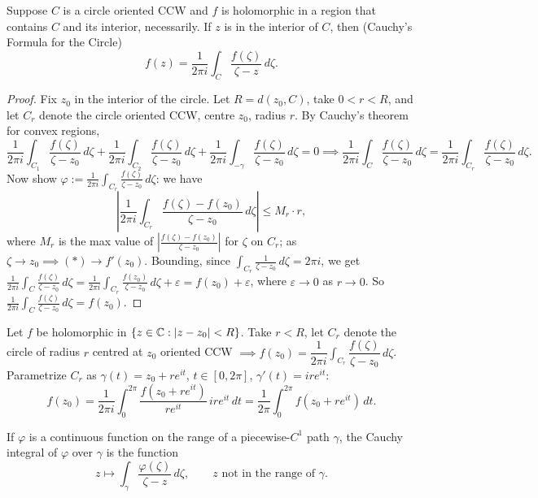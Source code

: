\documentclass[11pt]{article}
\begin{document}
\begin{theorem}
Suppose $C$ is a circle oriented CCW and $f$ is holomorphic in a region that contains $C$ and its interior, necessarily. If $z$ is in the interior of $C$, then \textup{(Cauchy's Formula for the Circle)}
\[
f(z) = \frac{1}{2\pi i} \int_C \frac{f(\zeta)}{\zeta - z} \, d\zeta.
\]
\end{theorem}

\begin{proof}
Fix $z_0$ in the interior of the circle. Let $R = d(z_0,C)$, take $0<r<R$, and let $C_r$ denote the circle oriented CCW, centre $z_0$, radius $r$. By Cauchy's theorem for convex regions,
\[
\frac{1}{2\pi i}\int_{C_1} \frac{f(\zeta)}{\zeta-z_0}\,d\zeta + \frac{1}{2\pi i}\int_{C_2} \frac{f(\zeta)}{\zeta-z_0}\,d\zeta + \frac{1}{2\pi i}\int_{-\gamma} \frac{f(\zeta)}{\zeta-z_0}\,d\zeta = 0 \implies \frac{1}{2\pi i}\int_C\frac{f(\zeta)}{\zeta-z_0}\,d\zeta = \frac{1}{2\pi i}\int_{C_r}\frac{f(\zeta)}{\zeta-z_0}\,d\zeta.
\]
Now show $\varphi := \frac{1}{2\pi i}\int_{C_r}\frac{f(\zeta)}{\zeta-z_0}\,d\zeta$: we have
\[
\left|\frac{1}{2\pi i}\int_{C_r}\frac{f(\zeta)-f(z_0)}{\zeta-z_0}\,d\zeta\right| \le M_r\cdot r,
\]
where $M_r$ is the max value of $\left|\frac{f(\zeta)-f(z_0)}{\zeta-z_0}\right|$ for $\zeta$ on $C_r$; as $\zeta \to z_0 \implies (*) \to f'(z_0)$. Bounding, since $\int_{C_r}\frac{1}{\zeta-z_0}\,d\zeta = 2\pi i$, we get $\frac{1}{2\pi i}\int_C\frac{f(\zeta)}{\zeta-z_0}\,d\zeta = \frac{1}{2\pi i}\int_{C_r}\frac{f(z_0)}{\zeta-z_0}\,d\zeta + \varepsilon = f(z_0) + \varepsilon$, where $\varepsilon \to 0$ as $r \to 0$. So $\frac{1}{2\pi i}\int_C\frac{f(\zeta)}{\zeta-z_0}\,d\zeta = f(z_0)$.
\end{proof}

\begin{corollary}
Let $f$ be holomorphic in $\{z\in{\mathbb{C}} : |z-z_0|<R\}$. Take $r<R$, let $C_r$ denote the circle of radius $r$ centred at $z_0$ oriented CCW $\implies f(z_0) = \dfrac{1}{2\pi i}\int_{C_r} \dfrac{f(\zeta)}{\zeta-z_0}\,d\zeta$.
Parametrize $C_r$ as $\gamma(t) = z_0+re^{it}$, $t\in[0,2\pi]$, $\gamma'(t)=ire^{it}$:
\[
f(z_0) = \frac{1}{2\pi i}\int_0^{2\pi} \frac{f(z_0+re^{it})}{re^{it}}\,ire^{it}\,dt = \frac{1}{2\pi}\int_0^{2\pi} f(z_0+re^{it})\,dt.
\]
\end{corollary}

\begin{definition}
If $\varphi$ is a continuous function on the range of a piecewise-$C^1$ path $\gamma$, the Cauchy integral of $\varphi$ over $\gamma$ is the function
\[
z \mapsto \int_\gamma \frac{\varphi(\zeta)}{\zeta-z}\,d\zeta, \qquad z \text{ not in the range of } \gamma.
\]
\end{definition}
\end{document}
